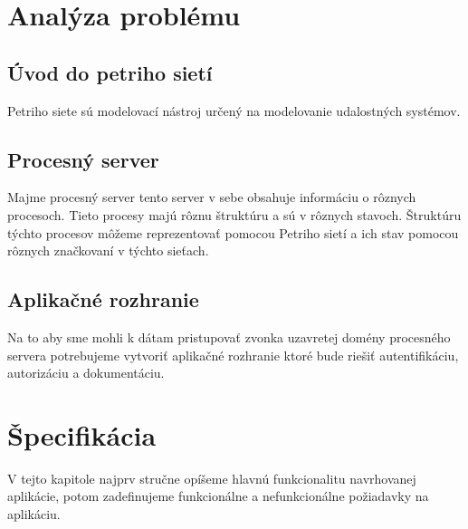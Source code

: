  

  

\section{Analýza problému} 

  

\subsection{Úvod do petriho sietí} %

 Petriho siete sú modelovací nástroj určený na modelovanie udalostných systémov. 


  

  

\subsection{Procesný server} 

 Majme procesný server tento server v sebe obsahuje informáciu o rôznych procesoch. Tieto procesy majú rôznu štruktúru a sú v rôznych stavoch. Štruktúru týchto procesov môžeme reprezentovať pomocou Petriho sietí a ich stav pomocou rôznych značkovaní v týchto sieťach.  


  

\subsection{Aplikačné rozhranie} 

 Na to aby sme mohli k dátam pristupovať zvonka uzavretej domény procesného servera potrebujeme vytvoriť aplikačné rozhranie ktoré bude riešiť autentifikáciu, autorizáciu a dokumentáciu.  


  

  

  

  

\section{Špecifikácia} 

 V tejto kapitole najprv stručne opíšeme hlavnú funkcionalitu navrhovanej aplikácie, potom zadefinujeme funkcionálne a nefunkcionálne požiadavky na aplikáciu. 

